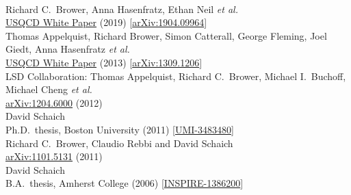 \begin{spacelist}
\begin{revnumerate}
    \pagebreakitem
       \\
      Richard C.~Brower, Anna Hasenfratz, Ethan Neil \textit{et al.} \\ %
      \href{http://home.fnal.gov/~ask/USQCD/members/WP/BSMwhitepaper2018.pdf}{USQCD White Paper} (2019) [\href{http://arxiv.org/abs/1904.09964}{arXiv:1904.09964}]
    \pagebreakitem
       \\
      Thomas Appelquist, Richard Brower, Simon Catterall, George Fleming, Joel Giedt, Anna Hasenfratz \textit{et al.} \\ %
      \href{http://www.usqcd.org/documents/13BSM.pdf}{USQCD White Paper} (2013) [\href{http://arxiv.org/abs/1309.1206}{arXiv:1309.1206}]
    \pagebreakitem
       \\
      LSD Collaboration: Thomas Appelquist, Richard C.~Brower, Michael I.~Buchoff, Michael Cheng \textit{et al.} \\ %
      \href{http://arxiv.org/abs/1204.6000}{arXiv:1204.6000} (2012)
    \pagebreakitem
       \\
      David Schaich \\
      Ph.D.\ thesis, Boston University (2011) [\href{http://gradworks.umi.com/34/83/3483480.html}{UMI-3483480}]
    \pagebreakitem
       \\
      Richard C.~Brower, Claudio Rebbi and David Schaich \\
      \href{http://arxiv.org/abs/1101.5131}{arXiv:1101.5131} (2011)
    \pagebreakitem
       \\
      David Schaich \\
      B.A.\ thesis, Amherst College (2006) [\href{http://inspirehep.net/record/1386200}{INSPIRE-1386200}] \\
%
%
%

\end{revnumerate}
\end{spacelist}
